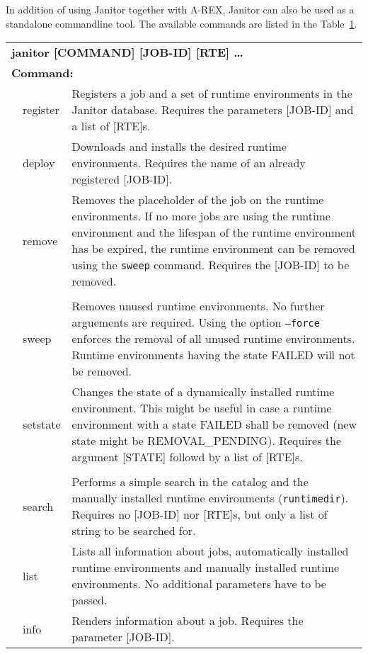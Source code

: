 In addition of using Janitor together with A-REX, Janitor can also be used as a standalone commandline tool.
The available commands are listed in the Table~\ref{tab:janitor_commandline_man}.
\begin{table}[!h]
   \begin{center}
        \label{tab:janitor_commandline_man}
	\begin{tabular}{p{0.5cm}p{2cm}p{11cm}}
	\multicolumn{3}{l}{\textbf{janitor [COMMAND] [JOB-ID] [RTE] \dots}} \\
	\multicolumn{3}{l}{\textbf{Command:}}\\
	&	register			& Registers a job and a set of runtime environments in the Janitor database. Requires the parameters [JOB-ID] and a list of [RTE]s.\\
	&	deploy				& Downloads and installs the desired runtime environments. Requires the name of an already registered [JOB-ID].\\
	&	remove				& Removes the placeholder of the job on the runtime environments. If no more jobs are using the runtime environment and the lifespan of the runtime environment has be expired, the runtime environment can be removed using the \texttt{sweep} command. Requires the [JOB-ID] to be removed.\\
	&					&\\
	&	sweep				& Removes unused runtime environments. No further arguements are required. Using the option \texttt{--force} enforces the removal of all unused runtime environments. Runtime environments having the state FAILED will not be removed.\\
	&	setstate			& Changes the state of a dynamically installed runtime environment. This might be useful in case a runtime environment with a state FAILED shall be removed (new state might be REMOVAL\_PENDING). Requires the argument [STATE] followd by a list of [RTE]s.\\
	&					&\\
	&	search				& Performs a simple search in the catalog and the manually installed runtime environments (\texttt{runtimedir}). Requires no [JOB-ID] nor [RTE]s, but only a list of string to be searched for.\\
	&	list				& Lists all information about jobs, automatically installed runtime environments and manually installed runtime environments. No additional parameters have to be passed.\\
	&	info				& Renders information about a job. Requires the parameter [JOB-ID].\\

\end{tabular}
\end{center}
\end{table}
